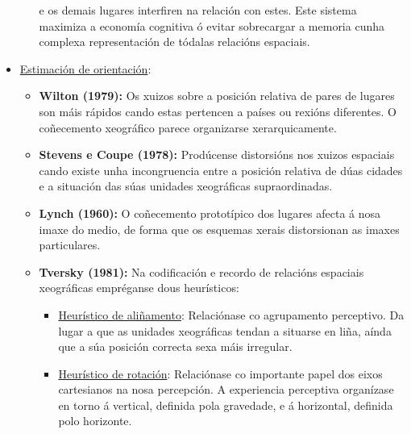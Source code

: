 \documentclass[a4paper,11pt]{article}
\begin{document}
\begin{itemize}
\begin{itemize}
		e os demais lugares interfiren na relación con estes. Este sistema maximiza a economía 
		cognitiva ó evitar sobrecargar a memoria cunha complexa representación de tódalas relacións 
		espaciais. 
	\end{itemize} 
	\item \underline{Estimación de orientación}: 
	\begin{itemize}
		\item \textbf{Wilton (1979):} Os xuizos sobre a posición relativa de pares de lugares son 
		máis rápidos cando estas pertencen a países ou rexións diferentes. O coñecemento xeográfico 
		parece organizarse xerarquicamente. 
		\item \textbf{Stevens e Coupe (1978):} Prodúcense distorsións nos xuizos espaciais cando 
		existe unha incongruencia entre a posición relativa de dúas cidades e a situación das súas 
		unidades xeográficas supraordinadas. 
		\item \textbf{Lynch (1960):} O coñecemento prototípico dos lugares afecta á nosa imaxe do 
		medio, de forma que os esquemas xerais distorsionan as imaxes particulares. 
		\item \textbf{Tversky (1981):} Na codificación e recordo de relacións espaciais xeográficas 
		empréganse dous heurísticos:
		\begin{itemize}
			\item \underline{Heurístico de aliñamento}: Relaciónase co agrupamento perceptivo. Da 
			lugar a que as unidades xeográficas tendan a situarse en liña, aínda que a súa posición 
			correcta sexa máis irregular.
			\item \underline{Heurístico de rotación}: Relaciónase co importante papel dos eixos 
			cartesianos na nosa percepción. A experiencia perceptiva organízase en torno á vertical, 
			definida pola gravedade, e á horizontal, definida polo horizonte. 
		\end{itemize}
	\end{itemize}
\end{itemize}
\end{document}
